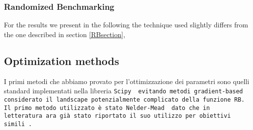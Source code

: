 \subsubsection{Randomized Benchmarking}
For the results we present in the following the technique used slightly differs from the one described in section \ref{RBsection}, %

\begin{comment}
        SINGLE QUBIT RANDOMIZED BENCHMARKING (for gates >= 40ns)
The program consists in playing random sequences of Clifford gates and measuring the state of the resonator afterwards.
Each random sequence is derived on the FPGA for the maximum depth (specified as an input) and played for each depth
asked by the user (the sequence is truncated to the desired depth). Each truncated sequence ends with the recovery gate,
found at each step thanks to a preloaded lookup table (Cayley table), that will bring the qubit back to its ground state.

If the readout has been calibrated and is good enough, then state discrimination can be applied to only return the state
of the qubit. Otherwise, the 'I' and 'Q' quadratures are returned.
Each sequence is played n_avg times for averaging. A second averaging is performed by playing different random sequences.

The data is then post-processed to extract the single-qubit gate fidelity and error per gate
.
Prerequisites:
    - Having found the resonance frequency of the resonator coupled to the qubit under study (resonator_spectroscopy).
    - Having calibrated qubit pi pulse (x180) by running qubit, spectroscopy, rabi_chevron, power_rabi and updated the config.
    - Having the qubit frequency perfectly calibrated (ramsey).
    - (optional) Having calibrated the readout (readout_frequency, amplitude, duration_optimization IQ_blobs) for better SNR.

\end{comment}
\subsection{Optimization methods}\label{Sec:OptimizationMethods}
I primi metodi che abbiamo provato per l'ottimizzazione dei parametri sono quelli standard implementati nella libreria \tt{Scipy} \cite{SciPy-NMeth} evitando metodi gradient-based considerato il landscape potenzialmente complicato della funzione RB.
Il primo metodo utilizzato è stato Nelder-Mead \cite{NelderMeads} dato che in letteratura ara già stato riportato il suo utilizzo per obiettivi simili \cite{kelly_optimal_2014}.

